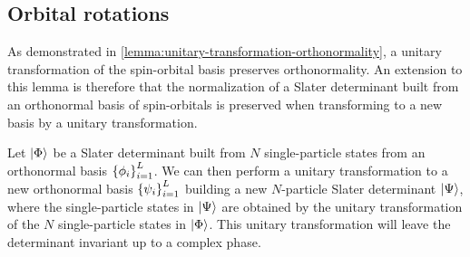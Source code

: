         \subsection{Orbital rotations}
            As demonstrated in
            \autoref{lemma:unitary-transformation-orthonormality}, a unitary
            transformation of the spin-orbital basis preserves orthonormality.
            An extension to this lemma is therefore that the normalization of a
            Slater determinant built from an orthonormal basis of spin-orbitals
            is preserved when transforming to a new basis by a unitary
            transformation.
            \begin{lemma}
                \label{lemma:unitary-transformation-slater}
                Let $\ket{\Phi}$ be a Slater determinant built from $N$
                single-particle states from an orthonormal basis
                $\left\{ \phi_i \right\}_{i = 1}^{L}$.
                We can then perform a unitary transformation to a new
                orthonormal basis $\left\{ \psi_i \right\}_{i = 1}^{L}$ building a new
                $N$-particle Slater determinant $\ket{\Psi}$, where the
                single-particle states in $\ket{\Psi}$ are obtained by the
                unitary transformation of the $N$ single-particle states in
                $\ket{\Phi}$.
                This unitary transformation will leave the determinant invariant
                up to a complex phase.
            \end{lemma}
